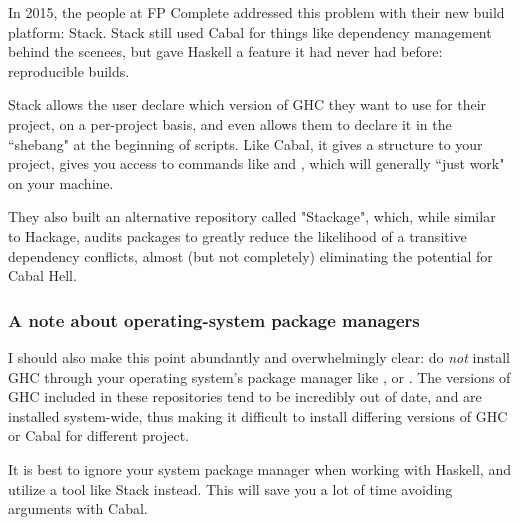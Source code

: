 In 2015, the people at FP Complete addressed this problem with their new build platform: Stack.  Stack still used Cabal for things like dependency management behind the scenees, but gave Haskell a feature it had never had before: reproducible builds. 

Stack allows the user declare which version of GHC they want to use for their project, on a per-project basis, and even allows them to declare it in the ``shebang" at the beginning of scripts.  Like Cabal, it gives a structure to your project, gives you access to commands like  and , which will generally ``just work" on your machine. 

They also built an alternative repository called "Stackage", which, while similar to Hackage, audits packages to greatly reduce the likelihood of a transitive dependency conflicts, almost (but not completely) eliminating the potential for Cabal Hell. 

\subsubsection{A note about operating-system package managers}
I should also make this point abundantly and overwhelmingly clear: do \textit{not} install GHC through your operating system's package manager like ,  or . The versions of GHC included in these repositories tend to be incredibly out of date, and are installed system-wide, thus making it difficult to install differing versions of GHC or Cabal for different project. 

It is best to ignore your system package manager when working with Haskell, and utilize a tool like Stack instead.  This will save you a lot of time avoiding arguments with Cabal. 



%
%


